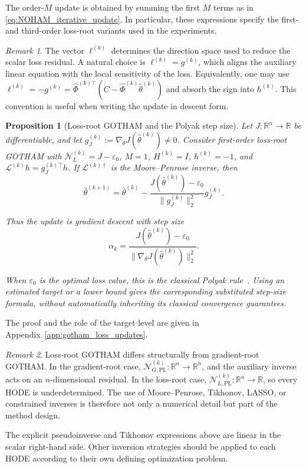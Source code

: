 \documentclass[11pt]{article}
\newtheorem{proposition}{Proposition}[section]
\theoremstyle{remark}
\newtheorem{remark}{Remark}[section]
\begin{document}
The order-$M$ update is obtained by summing the first $M$ terms as in
\eqref{eq:NOHAM_iterative_update}. In particular, these expressions
specify the first- and third-order loss-root variants used in the
experiments.
\begin{remark}
The vector $\ell^{(k)}$ determines the direction space used to reduce the scalar loss residual. A natural choice is $\ell^{(k)}=g^{(k)}$, which aligns the auxiliary linear equation with the local sensitivity of the loss. Equivalently, one may use $\ell^{(k)}=-g^{(k)}=\hat{\Phi}^{(k)\top}(C-\hat{\Phi}^{(k)}\hat{\theta}^{(k)})$ and absorb the sign into $\hbar^{(k)}$. This convention is useful when writing the update in descent form.
\end{remark}
\begin{proposition}[Loss-root GOTHAM and the Polyak step size]
\label{prop:loss_root_polyak_stepsize}
Let $J:\mathbb R^n\to\mathbb R$ be differentiable, and let
$g_J^{(k)}:=\nabla_\theta J(\hat\theta^{(k)})\ne0$.
Consider first-order loss-root GOTHAM with
$\mathcal N_L^{(k)}=J-\varepsilon_0$, $M=1$, $H^{(k)}=I$,
$\hbar^{(k)}=-1$, and
$\mathcal L^{(k)}h=g_J^{(k)\top}h$.
If $\mathcal L^{(k)\dagger}$ is the Moore--Penrose inverse, then
\begin{equation}
\label{eq:loss_root_polyak_update}
    \hat{\theta}^{(k+1)}
    =
    \hat{\theta}^{(k)}
    -
    \frac{
    J(\hat{\theta}^{(k)})-\varepsilon_0
    }{
    \|g_J^{(k)}\|_2^2
    }
    g_J^{(k)}.
\end{equation}

Thus the update is gradient descent with step size
\begin{equation}
\label{eq:polyak_stepsize}
    \alpha_k
    =
    \frac{
    J(\hat{\theta}^{(k)})-\varepsilon_0
    }{
    \|\nabla_{\theta}J(\hat{\theta}^{(k)})\|_2^2
    }.
\end{equation}

When $\varepsilon_0$ is the optimal loss value, this is the classical
Polyak rule~\cite{Polyak1969}. Using an estimated target or a lower
bound gives the corresponding substituted step-size formula, without
automatically inheriting its classical convergence guarantees.
\end{proposition}

The proof and the role of the target level are given in
Appendix~\ref{app:gotham_loss_updates}.
\begin{remark}
Loss-root GOTHAM differs structurally from gradient-root GOTHAM. In the gradient-root case, $\mathcal{N}_{G,\mathrm{PL}}^{(k)}:\mathbb{R}^n\to\mathbb{R}^n$, and the auxiliary inverse acts on an $n$-dimensional residual. In the loss-root case, $\mathcal{N}_{L,\mathrm{PL}}^{(k)}:\mathbb{R}^n\to\mathbb{R}$, so every HODE is underdetermined. The use of Moore--Penrose, Tikhonov, LASSO, or constrained inverses is therefore not only a numerical detail but part of the method design.
\end{remark}
The explicit pseudoinverse and Tikhonov expressions above are linear
in the scalar right-hand side. Other inversion strategies should be
applied to each HODE according to their own defining optimization problem.
\end{document}
